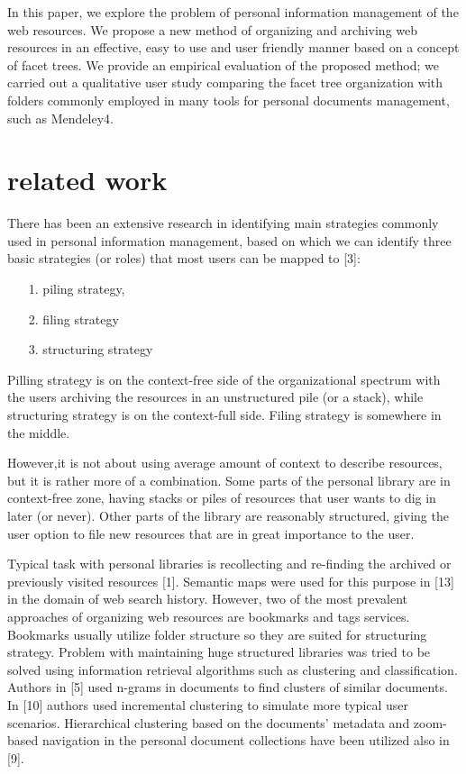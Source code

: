 \documentclass[12pt]{article}
\begin{document}
In this paper, we explore the problem of personal information management of the web resources. We propose a new method of organizing and archiving web resources in an effective, easy to use and user friendly manner based on a concept of facet trees. We provide an empirical evaluation of the proposed method; we carried out a qualitative user study comparing the facet tree organization with folders commonly employed in many tools for personal documents management, such as Mendeley4. 
 
\section{related work}

There has been an extensive research in identifying main strategies commonly used in personal information management, based on which we can identify three basic strategies (or roles) that most users can be mapped to [3]: 

    \begin{enumerate}
        \item [1.]piling strategy,
        \item[2.]filing strategy
        \item[3.]structuring strategy
    \end{enumerate}
    
  
 
Pilling strategy is on the context-free side of the organizational spectrum with the users archiving the resources in an unstructured pile (or a stack), while structuring strategy is on the context-full side. Filing strategy is somewhere in the middle.





 However,it is not about using average amount of context to describe resources, but it is rather more of a combination. Some parts of the personal library are in context-free zone, having stacks or piles of resources that user wants to dig in later (or never). Other parts of the library are reasonably structured, giving the user option to file new resources that are in great importance to the user.
 
  Typical task with personal libraries is recollecting and re-finding the archived or previously visited resources [1]. Semantic maps were used for this purpose in [13] in the domain of web search history. However, two of the most prevalent approaches of organizing web resources are bookmarks and tags services. Bookmarks usually utilize folder structure so they are suited for structuring strategy. Problem with maintaining huge structured libraries was tried to be solved using information retrieval algorithms such as clustering and classification. Authors in [5] used n-grams in documents to find clusters of similar documents. In [10] authors used incremental clustering to simulate more typical user scenarios. Hierarchical clustering based on the documents’ metadata and zoom-based navigation in the personal document collections have been utilized also in [9]. 
  
\end{document}
